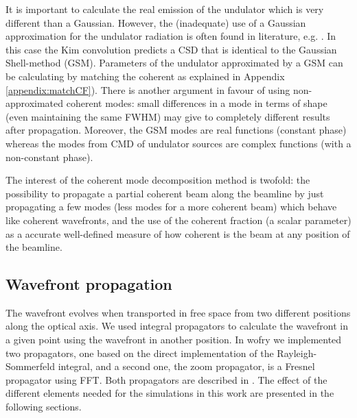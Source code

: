 \documentclass{iucr}              %
\begin{document}
It is important to calculate the real emission of the undulator which is very different than a Gaussian. However, the (inadequate) use of a Gaussian approximation for the undulator radiation is often found in literature, e.g.  \cite{coisson1997}. In this case the Kim convolution predicts a CSD that is identical to the Gaussian Shell-method (GSM). Parameters of the undulator approximated by a GSM can be calculating by matching the coherent as explained in Appendix \ref{appendix:matchCF}). There is another argument in favour of using non-approximated coherent modes: small differences in a mode in terms of shape (even maintaining the same FWHM) may give to completely different results after propagation. Moreover, the GSM modes are real functions (constant phase) whereas the modes from CMD of undulator sources are complex functions (with a non-constant phase).

The interest of the coherent mode decomposition method is twofold: the possibility to propagate a partial coherent beam along the beamline by just propagating a few modes (less modes for a more coherent beam) which behave like coherent wavefronts, and the use of the coherent fraction (a scalar parameter) as a accurate well-defined measure of how coherent is the beam at any position of the beamline.

\subsection{Wavefront propagation}


The wavefront evolves when transported in free space from two different positions along the optical axis. We used integral propagators to calculate the wavefront in a given point using the wavefront in another position. In wofry we implemented two propagators, one based on the direct implementation of the  Rayleigh-Sommerfeld integral, and a second one, the zoom propagator, is a Fresnel propagator using FFT. Both propagators are described in \cite{srioLBL}. The effect of the different elements needed for the simulations in this work are presented in the following sections. 
\end{document}
